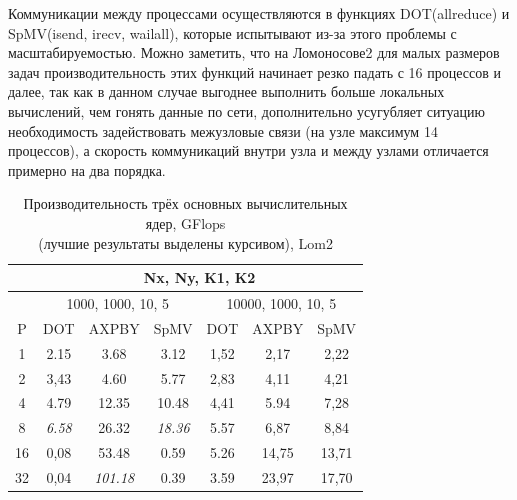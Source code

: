 		Коммуникации между процессами осуществляются в функциях DOT(allreduce) и SpMV(isend, irecv, wailall), которые испытывают из-за этого проблемы с масштабируемостью. Можно заметить, что на Ломоносове2 для малых размеров задач производительность этих функций начинает резко падать с 16 процессов и далее, так как в данном случае выгоднее выполнить больше локальных вычислений, чем гонять данные по сети, дополнительно усугубляет ситуацию необходимость задействовать межузловые связи (на узле максимум 14 процессов), а скорость коммуникаций внутри узла и между узлами отличается примерно на два порядка.

		\begin{table}[H]
			\begin{tabular}{|c||c|c|c|c|c|c|}
				\hline
				& \multicolumn{6}{|c|}{Nx, Ny, K1, K2} \\ \hline
				   & \multicolumn{3}{c|}{1000, 1000, 10, 5} & \multicolumn{3}{c|}{10000, 1000, 10, 5} \\ \hline
				P  & DOT                   & AXPBY          &SpMV            & DOT &AXPBY&SpMV \\ \hline
				1  & 2.15                  &3.68            &3.12            & 1,52&2,17 &2,22 \\ \hline
				2  & 3,43                  &4.60            &5.77            & 2,83&4,11 &4,21 \\ \hline
				4  & 4.79                  &12.35           &10.48           & 4,41&5.94 &7,28 \\ \hline
				8  & \textit{6.58}         &26.32           &\textit{18.36}  & 5.57&6,87 &8,84 \\ \hline
				16 & 0,08                  &53.48           &0.59            & 5.26&14,75&13,71 \\ \hline
				32 & 0,04                  &\textit{101.18} &0.39            & 3.59&23,97&17,70 \\ \hline
			\end{tabular}
			\caption{Производительность трёх основных вычислительных ядер, GFlops\\(лучшие результаты выделены курсивом), Lom2}
			\label{real_perf}
		\end{table}
